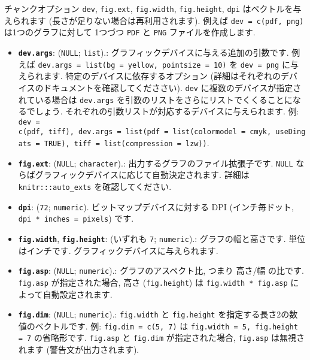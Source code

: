 \documentclass[
  11pt,
  lualatex,ja=standard,jafont=noto]{bxjsreport}
\providecommand{\tightlist}{%
  \setlength{\itemsep}{0pt}\setlength{\parskip}{0pt}}
\begin{document}
チャンクオプション \texttt{dev}, \texttt{fig.ext}, \texttt{fig.width}, \texttt{fig.height}, \texttt{dpi} はベクトルを与えられます (長さが足りない場合は再利用されます). 例えば \texttt{dev = c(\textquotesingle{}pdf\textquotesingle{},\ \textquotesingle{}png\textquotesingle{})} は1つのグラフに対して 1つづつ \texttt{PDF} と \texttt{PNG} ファイルを作成します.

\begin{itemize}
\tightlist
\item
  \textbf{\texttt{dev.args}}: (\texttt{NULL}; \texttt{list}).: グラフィックデバイスに与える追加の引数です. 例えば \texttt{dev.args = list(bg = \textquotesingle{}yellow\textquotesingle{},\ pointsize\ =\ 10)} を \texttt{dev = \textquotesingle{}png\textquotesingle{}} に与えられます. 特定のデバイスに依存するオプション (詳細はそれぞれのデバイスのドキュメントを確認してくだささい). \texttt{dev} に複数のデバイスが指定されている場合は \texttt{dev.args} を引数のリストをさらにリストでくくることになるでしょう. それぞれの引数リストが対応するデバイスに与えられます. 例: \texttt{dev = c(\textquotesingle{}pdf\textquotesingle{},\ \textquotesingle{}tiff\textquotesingle{}),\ dev.args\ =\ list(pdf\ =\ list(colormodel\ =\ \textquotesingle{}cmyk\textquotesingle{},\ useDingats\ =\ TRUE),\ tiff\ =\ list(compression\ =\ \textquotesingle{}lzw\textquotesingle{}))}.
\item
  \textbf{\texttt{fig.ext}}: (\texttt{NULL}; \texttt{character}).: 出力するグラフのファイル拡張子です. \texttt{NULL} ならばグラフィックデバイスに応じて自動決定されます. 詳細は \texttt{knitr:::auto\_exts} を確認してください.
\item
  \textbf{\texttt{dpi}}: (\texttt{72}; \texttt{numeric}). ビットマップデバイスに対する DPI (インチ毎ドット, \texttt{dpi * inches = pixels}) です.
\item
  \textbf{\texttt{fig.width}}, \textbf{\texttt{fig.height}}: (いずれも \texttt{7}; \texttt{numeric}).: グラフの幅と高さです. 単位はインチです. グラフィックデバイスに与えられます.
\item
  \textbf{\texttt{fig.asp}}: (\texttt{NULL}; \texttt{numeric}).: グラフのアスペクト比, つまり 高さ/幅 の比です. \texttt{fig.asp} が指定された場合, 高さ (\texttt{fig.height}) は \texttt{fig.width * fig.asp} によって自動設定されます.
\item
  \textbf{\texttt{fig.dim}}: (\texttt{NULL}; \texttt{numeric}).: \texttt{fig.width} と \texttt{fig.height} を指定する長さ2の数値のベクトルです. 例: \texttt{fig.dim = c(5, 7)} は \texttt{fig.width = 5, fig.height = 7} の省略形です. \texttt{fig.asp} と \texttt{fig.dim} が指定された場合, \texttt{fig.asp} は無視されます (警告文が出力されます).

\end{itemize}
\end{document}
